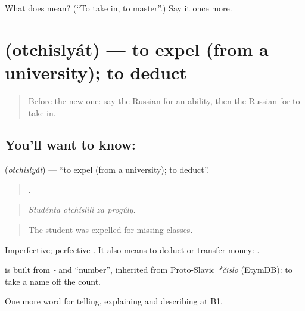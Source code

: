 \begin{tcolorbox}[breakable,colback=teal!4,colframe=teal!35!black,title={Before you move on}]
What does  mean? (\textquotedblleft{}To take in, to master\textquotedblright{}.) Say it once more.
\end{tcolorbox}
\section[\texorpdfstring{\ru{отчислять} (otchislyát)}{отчислять (otchislyát)}]{ (otchislyát) — to expel (from a university); to deduct}

\label{lesson:RU-C387-otchislyat}



\begin{quote}
Before the new one: say the Russian for an ability, then the Russian for to take in.
\end{quote}

\subsection*{You'll want to know: }
\textbf{} (\emph{otchislyát}) — \textquotedblleft{}to expel (from a university); to deduct\textquotedblright{}.

\begin{quote}
   .
\end{quote}

\begin{quote}
\emph{Studénta otchíslili za progúly.}
\end{quote}

\begin{quote}
The student was expelled for missing classes.
\end{quote}

Imperfective; perfective \emph{}. It also means to deduct or transfer money: \emph{ }.

\begin{cousinweb}
\textbf{} is built from \emph{-} and \emph{} \textquotedblleft{}number\textquotedblright{}, inherited from Proto-Slavic \emph{*čislo} (EtymDB): to take a name off the count.
\end{cousinweb}

\begin{grammarlens}[title={What you've built}]
One more word for telling, explaining and describing at B1.
\end{grammarlens}

